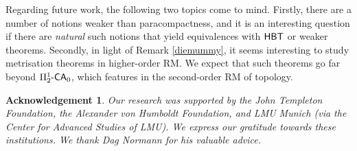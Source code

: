 \documentclass[reqno]{amsart}
\newtheorem{ack}[thm]{Acknowledgement}
\def\SIX{\Pi_{2}^{1}\text{-\textsf{\textup{CA}}}_{0}}
\def\HBT{\textup{\textsf{HBT}}}
\newcommand{\T}{\mathcal{T}}
\numberwithin{equation}{section}
\numberwithin{thm}{section}
\begin{document}
\smallskip

Regarding future work, the following two topics come to mind.  Firstly, there are a number of notions weaker than paracompactness, and it is an interesting question if there are \emph{natural} such notions that yield equivalences with $\HBT$ or weaker theorems.  
Secondly, in light of Remark \ref{diemummy}, it seems interesting to study metrisation theorems in higher-order RM.  We expect that such theorems go far beyond $\SIX$, which features in the second-order RM of topology.  
\begin{ack}\rm
Our research was supported by the John Templeton Foundation, the Alexander von Humboldt Foundation, and LMU Munich (via the Center for Advanced Studies of LMU).  %
We express our gratitude towards these institutions. 
We thank Dag Normann for his valuable advice.
\end{ack}



\appendix
\end{document}
